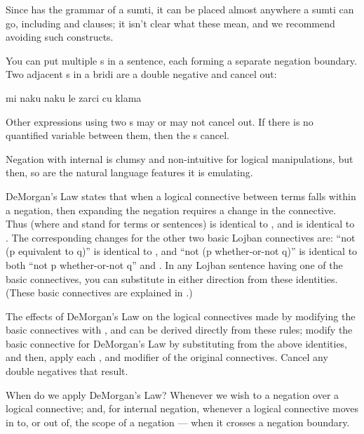 Since  has the grammar of a sumti, it can be placed
    almost anywhere a sumti can go, including  and 
    clauses; it isn't clear what these mean, and we recommend
    avoiding such constructs.

You can put multiple s in a sentence, each forming a
    separate negation boundary. Two adjacent s in a bridi
    are a double negative and cancel out:
\begin{example}
mi naku naku le zarci cu klama
\end{example}

Other expressions using two s may or may not cancel
    out. If there is no quantified variable between them, then the
    s cancel.

Negation with internal  is clumsy and non-intuitive
    for logical manipulations, but then, so are the natural
    language features it is emulating.



DeMorgan's Law states that when a logical connective between
    terms falls within a negation, then expanding the negation
    requires a change in the connective. Thus (where  and
     stand for terms or sentences)  is
    identical to , and  is
    identical to . The corresponding changes for
    the other two basic Lojban connectives are: ``not (p equivalent
    to q)'' is identical to , and ``not
    (p whether-or-not q)'' is identical to both ``not p
    whether-or-not q'' and . In any
    Lojban sentence having one of the basic connectives, you can
    substitute in either direction from these identities. (These
    basic connectives are explained in .)

The effects of DeMorgan's Law on the logical connectives
    made by modifying the basic connectives with , 
    and  can be derived directly from these rules; modify the
    basic connective for DeMorgan's Law by substituting from the
    above identities, and then, apply each ,  and
     modifier of the original connectives. Cancel any double
    negatives that result.

When do we apply DeMorgan's Law? Whenever we wish to
     a negation over a logical connective; and, for
    internal  negation, whenever a logical connective moves
    in to, or out of, the scope of a negation --- when it crosses a
    negation boundary.

